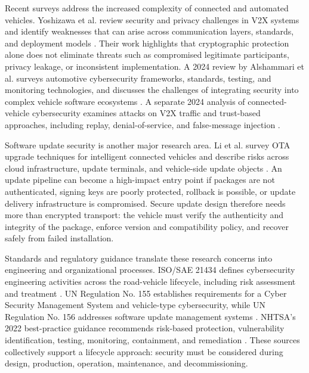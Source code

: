 \documentclass[11pt]{article}
\begin{document}
Recent surveys address the increased complexity of connected and automated vehicles. Yoshizawa et al. review security and privacy challenges in V2X systems and identify weaknesses that can arise across communication layers, standards, and deployment models \cite{yoshizawa2023}. Their work highlights that cryptographic protection alone does not eliminate threats such as compromised legitimate participants, privacy leakage, or inconsistent implementation. A 2024 review by Alshammari et al. surveys automotive cybersecurity frameworks, standards, testing, and monitoring technologies, and discusses the challenges of integrating security into complex vehicle software ecosystems \cite{alshammari2024}. A separate 2024 analysis of connected-vehicle cybersecurity examines attacks on V2X traffic and trust-based approaches, including replay, denial-of-service, and false-message injection \cite{cyacv2024}.

Software update security is another major research area. Li et al. survey OTA upgrade techniques for intelligent connected vehicles and describe risks across cloud infrastructure, update terminals, and vehicle-side update objects \cite{li2024ota}. An update pipeline can become a high-impact entry point if packages are not authenticated, signing keys are poorly protected, rollback is possible, or update delivery infrastructure is compromised. Secure update design therefore needs more than encrypted transport: the vehicle must verify the authenticity and integrity of the package, enforce version and compatibility policy, and recover safely from failed installation.

Standards and regulatory guidance translate these research concerns into engineering and organizational processes. ISO/SAE 21434 defines cybersecurity engineering activities across the road-vehicle lifecycle, including risk assessment and treatment \cite{iso21434}. UN Regulation No. 155 establishes requirements for a Cyber Security Management System and vehicle-type cybersecurity, while UN Regulation No. 156 addresses software update management systems \cite{unece155,unece156}. NHTSA's 2022 best-practice guidance recommends risk-based protection, vulnerability identification, testing, monitoring, containment, and remediation \cite{nhtsa2022}. These sources collectively support a lifecycle approach: security must be considered during design, production, operation, maintenance, and decommissioning.
\end{document}
